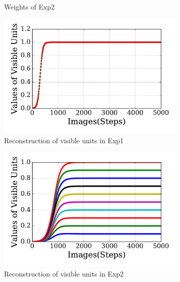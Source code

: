 \begin{figure}
\begin{subfigure}[t]{0.48\textwidth}
		\caption{Weights of Exp2}
	\end{subfigure}
	\begin{subfigure}[t]{0.48\textwidth}
		\includegraphics[width=\textwidth]{pics_sdlm/20_exp_AE/exp1_recon_non.pdf}
		\caption{Reconstruction of visible units in Exp1}
	\end{subfigure}
	\begin{subfigure}[t]{0.48\textwidth}
		\includegraphics[width=\textwidth]{pics_sdlm/20_exp_AE/exp2_recon_non.pdf}
		\caption{Reconstruction of visible units in Exp2}
	\end{subfigure}\\
	\begin{subfigure}[t]{0.48\textwidth}

\end{subfigure}
\end{figure}
